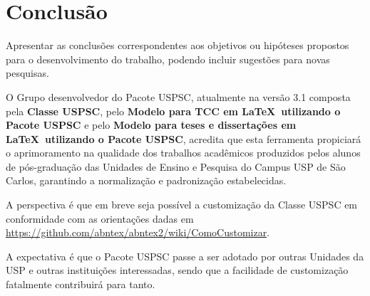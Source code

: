 \chapter{Conclusão}
Apresentar as conclusões correspondentes aos objetivos ou hipóteses propostos para o desenvolvimento do trabalho, podendo incluir  sugestões para novas pesquisas.

O Grupo desenvolvedor do Pacote USPSC, atualmente na versão 3.1 composta pela \textbf{Classe USPSC}, pelo \textbf{Modelo para TCC em \LaTeX\ utilizando o Pacote USPSC} e pelo \textbf{Modelo para teses e dissertações em \LaTeX\ utilizando o Pacote USPSC}, acredita que esta ferramenta propiciará o aprimoramento na qualidade dos trabalhos acadêmicos produzidos pelos alunos de pós-graduação das Unidades de Ensino e Pesquisa do Campus USP de São Carlos, garantindo a normalização e padronização estabelecidas.

A perspectiva é que em breve seja possível a customização da Classe USPSC em conformidade com as orientações dadas em \url{https://github.com/abntex/abntex2/wiki/ComoCustomizar}.

A expectativa é que o Pacote USPSC passe a ser adotado por outras Unidades da USP e outras instituições interessadas, sendo que a facilidade de customização fatalmente contribuirá para tanto.


